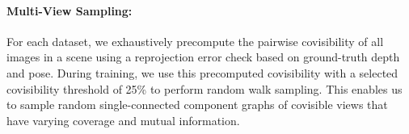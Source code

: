 \paragraph{Multi-View Sampling:}
For each dataset, we exhaustively precompute the pairwise covisibility of all images in a scene using a reprojection error check based on ground-truth depth and pose.
During training, we use this precomputed covisibility with a selected covisibility threshold of 25\% to perform random walk sampling.
This enables us to sample random single-connected component graphs of covisible views that have varying coverage and mutual information.












